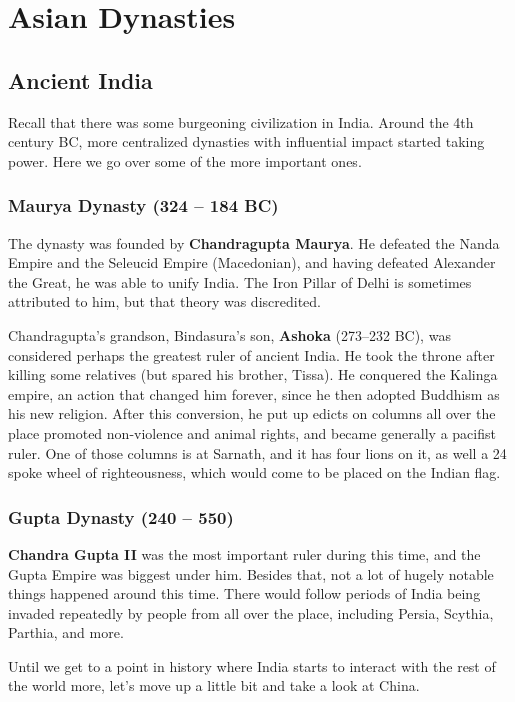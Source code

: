 \chapter{Asian Dynasties}

\section{Ancient India}

Recall that there was some burgeoning civilization in India.
Around the 4th century BC, more centralized dynasties with influential impact started taking power.
Here we go over some of the more important ones.

\subsection*{Maurya Dynasty (324 -- 184 BC)}

The dynasty was founded by \textbf{Chandragupta Maurya}.
He defeated the Nanda Empire and the Seleucid Empire (Macedonian),
and having defeated Alexander the Great, he was able to unify India.
The Iron Pillar of Delhi is sometimes attributed to him, but that theory was discredited.

Chandragupta's grandson, Bindasura's son,
\textbf{Ashoka} (273--232 BC), was considered perhaps the greatest ruler of ancient India.
He took the throne after killing some relatives (but spared his brother, Tissa).
He conquered the Kalinga empire, an action that changed him forever,
since he then adopted Buddhism as his new religion.
After this conversion, he put up edicts on columns all over the place
promoted non-violence and animal rights,
and became generally a pacifist ruler.
One of those columns is at Sarnath, and it has four lions on it,
as well a 24 spoke wheel of righteousness, which would come to be placed on the Indian flag.

\subsection*{Gupta Dynasty (240 -- 550)}

\textbf{Chandra Gupta II} was the most important ruler during this time,
and the Gupta Empire was biggest under him.
Besides that, not a lot of hugely notable things happened around this time.
There would follow periods of India being invaded repeatedly by people from
all over the place, including Persia, Scythia, Parthia, and more.

Until we get to a point in history where India starts to interact with the rest of the world more,
let's move up a little bit and take a look at China.

